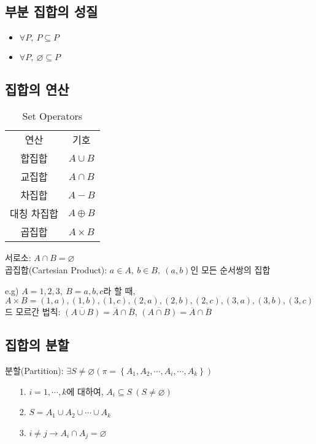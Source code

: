 \subsection{부분 집합의 성질}
\begin{itemize}
    \item $\forall P,\ P \subseteq P$
    \item $\forall P,\ \varnothing \subseteq P$
\end{itemize}
\subsection{집합의 연산}
\begin{table}[]
    \caption {Set Operators}
    \centering
    \begin{tabular}{c|c}
    연산      & 기호\\
    \Xhline{3\arrayrulewidth}
    합집합  & $A \cup B$\\
    \hline
    교집합 & $A \cap B$\\
    \hline
    차집합 &$A-B$\\
    \hline
    대칭 차집합&$A\oplus B$\\
    \hline
    곱집합&$A\times B$
    \end{tabular}
\end{table}$$$$
서로소: $A \cap B = \varnothing$\\
곱집합(Cartesian Product): $a\in A,\ b \in B,\ (a, b)$인 모든 순서쌍의 집합

e.g) $A={1, 2, 3},\ B={a, b, c}$라 할 때, $A\times B = {(1, a), (1, b), (1, c), (2, a), (2, b), (2, c), (3, a), (3, b), (3, c)}$\\
드 모르간 법칙: $\overline{(A\cup B)} = \overline{A} \cap \overline{B}$, $\overline{(A \cap B)} = \overline{A} \cap \overline{B}$

\subsection{집합의 분할}
분할(Partition): $\exists S \neq \varnothing (\pi = \left\{A_1, A_2, \cdots, A_i, \cdots, A_k\right\})$
\begin{itemize}
    \item[1.] $i=1, \cdots, k$에 대하여, $A_i \subseteq S\ (S \neq \varnothing)$
    \item[2.] $S=A_1\cup A_2\cup \cdots \cup A_k$
    \item[3.] $i\neq j \to A_i \cap A_j = \varnothing$
\end{itemize}

